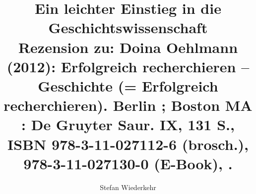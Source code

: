 
\fancyhead[R]{\thepage} %

\title{\LARGE{Ein leichter Einstieg in die Geschichtswissenschaft} \\ \large{Rezension zu: Doina Oehlmann (2012): Erfolgreich recherchieren –
Geschichte (= Erfolgreich recherchieren). Berlin ; Boston MA : De
Gruyter Saur. IX, 131 S., ISBN 978-3-11-027112-6 (brosch.),
978-3-11-027130-0 (E-Book), .}} %
\author{Stefan Wiederkehr} %
